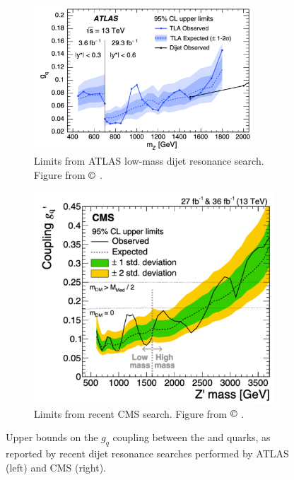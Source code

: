 \begin{figure}[hp]
	\centering
\begin{subfigure}[t]{0.57\textwidth}
	\centering
	\includegraphics[width=0.9\textwidth]{Figures/2/Dijet_limits_ATLAS.pdf}
\caption{Limits from ATLAS low-mass dijet resonance search. Figure from $\copyright$ \cite{dijet_2}.}
\label{fig:dijet_gq_limits_ATLAS}
\end{subfigure}
\begin{subfigure}[t]{0.41\textwidth}
	\centering
	\includegraphics[width=0.99\textwidth]{Figures/2/Dijet_limits_CMS.pdf}
\caption{Limits from recent CMS search. Figure from $\copyright$ \cite{dijet_3}.}
\label{fig:dijet_gq_limits_CMS}
\end{subfigure}
	\caption{Upper bounds on the \(g_q\) coupling between the \Zprime and quarks, as reported by recent dijet resonance searches performed by ATLAS (left) and CMS (right).}
	\label{fig:Dijet_gq_limits}
\end{figure}

